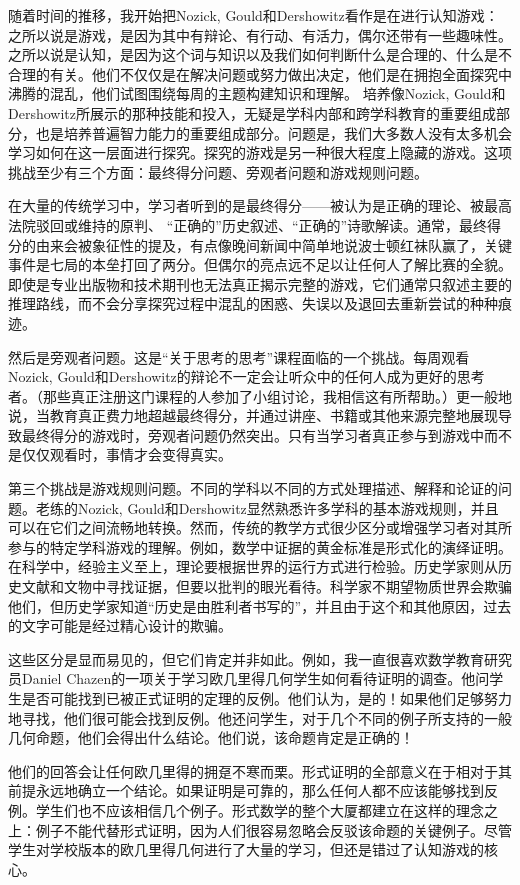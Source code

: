 随着时间的推移，我开始把Nozick, Gould和Dershowitz看作是在进行认知游戏：之所以说是游戏，是因为其中有辩论、有行动、有活力，偶尔还带有一些趣味性。之所以说是认知，是因为这个词与知识以及我们如何判断什么是合理的、什么是不合理的有关。他们不仅仅是在解决问题或努力做出决定，他们是在拥抱全面探究中沸腾的混乱，他们试图围绕每周的主题构建知识和理解。
培养像Nozick, Gould和Dershowitz所展示的那种技能和投入，无疑是学科内部和跨学科教育的重要组成部分，也是培养普遍智力能力的重要组成部分。问题是，我们大多数人没有太多机会学习如何在这一层面进行探究。探究的游戏是另一种很大程度上隐藏的游戏。这项挑战至少有三个方面：最终得分问题、旁观者问题和游戏规则问题。

在大量的传统学习中，学习者听到的是最终得分——被认为是正确的理论、被最高法院驳回或维持的原判、 “正确的”历史叙述、“正确的”诗歌解读。通常，最终得分的由来会被象征性的提及，有点像晚间新闻中简单地说波士顿红袜队赢了，关键事件是七局的本垒打回了两分。但偶尔的亮点远不足以让任何人了解比赛的全貌。即使是专业出版物和技术期刊也无法真正揭示完整的游戏，它们通常只叙述主要的推理路线，而不会分享探究过程中混乱的困惑、失误以及退回去重新尝试的种种痕迹。

然后是旁观者问题。这是“关于思考的思考”课程面临的一个挑战。每周观看Nozick, Gould和Dershowitz的辩论不一定会让听众中的任何人成为更好的思考者。（那些真正注册这门课程的人参加了小组讨论，我相信这有所帮助。）更一般地说，当教育真正费力地超越最终得分，并通过讲座、书籍或其他来源完整地展现导致最终得分的游戏时，旁观者问题仍然突出。只有当学习者真正参与到游戏中而不是仅仅观看时，事情才会变得真实。

第三个挑战是游戏规则问题。不同的学科以不同的方式处理描述、解释和论证的问题。老练的Nozick, Gould和Dershowitz显然熟悉许多学科的基本游戏规则，并且可以在它们之间流畅地转换。然而，传统的教学方式很少区分或增强学习者对其所参与的特定学科游戏的理解。例如，数学中证据的黄金标准是形式化的演绎证明。在科学中，经验主义至上，理论要根据世界的运行方式进行检验。历史学家则从历史文献和文物中寻找证据，但要以批判的眼光看待。科学家不期望物质世界会欺骗他们，但历史学家知道“历史是由胜利者书写的”，并且由于这个和其他原因，过去的文字可能是经过精心设计的欺骗。

这些区分是显而易见的，但它们肯定并非如此。例如，我一直很喜欢数学教育研究员Daniel Chazen的一项关于学习欧几里得几何学生如何看待证明的调查。他问学生是否可能找到已被正式证明的定理的反例。他们认为，是的！如果他们足够努力地寻找，他们很可能会找到反例。他还问学生，对于几个不同的例子所支持的一般几何命题，他们会得出什么结论。他们说，该命题肯定是正确的！

他们的回答会让任何欧几里得的拥趸不寒而栗。形式证明的全部意义在于相对于其前提永远地确立一个结论。如果证明是可靠的，那么任何人都不应该能够找到反例。学生们也不应该相信几个例子。形式数学的整个大厦都建立在这样的理念之上：例子不能代替形式证明，因为人们很容易忽略会反驳该命题的关键例子。尽管学生对学校版本的欧几里得几何进行了大量的学习，但还是错过了认知游戏的核心。

